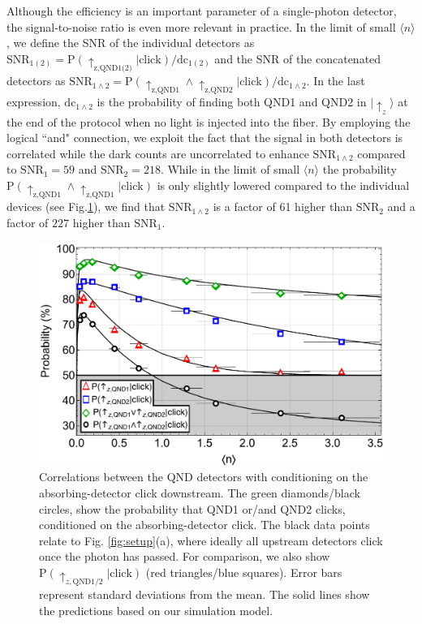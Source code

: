 \documentclass[prl,twocolumn,amsmath,amssymb,bibnotes,aps,longbibliography]{revtex4-1}
\newcommand{\ket}[1]{|{#1}\rangle}
\newcommand{\braket}[1]{\langle{#1}\rangle}
\begin{document}
Although the efficiency is an important parameter of a single-photon detector, the signal-to-noise ratio is even more relevant in practice. In the limit of small $\braket{n}$, we define the SNR of the individual detectors as $\text{SNR}_{1(2)}=\text{P}(\uparrow_{\text{z,QND1(2)}}\vert\text{click})/\text{dc}_{1(2)}$ and the SNR of the concatenated detectors as $\text{SNR}_{1\land2}=\text{P}(\uparrow_{\text{z,QND1}}\land\uparrow_{\text{z,QND2}}\vert\text{click})/\text{dc}_{1\land2}$. In the last expression, $\text{dc}_{1\land2}$ is the probability of finding both QND1 and QND2 in $\ket{\uparrow_z}$ at the end of the protocol when no light is injected into the fiber. By employing the logical ``and" connection, we exploit the fact that the signal in both detectors is correlated while the dark counts are uncorrelated to enhance $\text{SNR}_{1\land2}$ compared to $\text{SNR}_{1}=59$ and $\text{SNR}_{2}=218$. While in the limit of small $\braket{n}$ the probability $\text{P}(\uparrow_{\text{z,QND1}}\land\uparrow_{\text{z,QND1}}\vert\text{click})$ is only slightly lowered compared to the individual devices (see Fig.\ref{fig:efficiency}), we find that $\text{SNR}_{1\land2}$ is a factor of 61 higher than $\text{SNR}_2$ and a factor of $227$ higher than $\text{SNR}_1$.
\begin{figure}[t]
\centering
\includegraphics[width=\columnwidth]{Fig3.pdf}
\caption{\label{fig:efficiency} Correlations between the QND detectors with conditioning on the absorbing-detector click downstream. The green diamonds/black circles, show the probability that QND1 or/and QND2 clicks, conditioned on the absorbing-detector click. The black data points relate to Fig. \ref{fig:setup}(a), where ideally all upstream detectors click once the photon has passed. For comparison, we also show $\text{P}(\uparrow_{z,\text{QND1/2}}\vert\text{click})$ (red triangles/blue squares). Error bars represent standard deviations from the mean. The solid lines show the predictions based on our simulation model.}
\end{figure}
\end{document}
